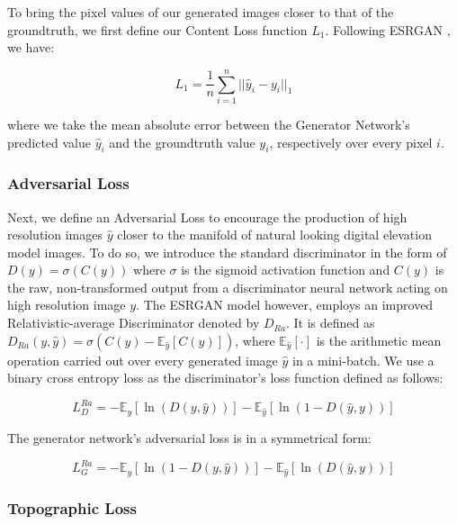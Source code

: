 \documentclass[tc, manuscript]{copernicus}
\begin{document}
To bring the pixel values of our generated images closer to that of the groundtruth, we first define our Content Loss function $L_1$.
Following ESRGAN \citep{WangESRGANEnhancedSuperResolution2018}, we have:

\begin{equation}\label{eq:4}
  L_1 = \dfrac{1}{n} \sum\limits_{i=1}^n ||\hat{y}_i - y_i||_{1}
\end{equation}

where we take the mean absolute error between the Generator Network's predicted value $\hat{y}_i$ and the groundtruth value $y_i$, respectively over every pixel $i$.

\subsubsection{Adversarial Loss}

Next, we define an Adversarial Loss to encourage the production of high resolution images $\hat{y}$ closer to the manifold of natural looking digital elevation model images.
To do so, we introduce the standard discriminator in the form of $D(y) = \sigma(C(y))$ where $\sigma$ is the sigmoid activation function and $C(y)$ is the raw, non-transformed output from a discriminator neural network acting on high resolution image $y$.
The ESRGAN model \citep{WangESRGANEnhancedSuperResolution2018} however, employs an improved Relativistic-average Discriminator \citep{Jolicoeur-Martineaurelativisticdiscriminatorkey2018} denoted by $D_{Ra}$.
It is defined as $D_{Ra}(y,\hat{y}) = \sigma(C(y) - \mathbb{E}_{\hat{y}}[C(\hat{y})])$, where $\mathbb{E}_{\hat{y}}[\cdot]$ is the arithmetic mean operation carried out over every generated image $\hat{y}$ in a mini-batch.
We use a binary cross entropy loss as the discriminator's loss function defined as follows:

\begin{equation}\label{eq:5}
  L_D^{Ra} = - \mathbb{E}_y[\ln(D(y,\hat{y}))] - \mathbb{E}_{\hat{y}}[\ln(1 - D(\hat{y},y))]
\end{equation}

The generator network's adversarial loss is in a symmetrical form:

\begin{equation}\label{eq:6}
  L_G^{Ra} = - \mathbb{E}_y[\ln(1 - D(y,\hat{y}))] - \mathbb{E}_{\hat{y}}[\ln(D(\hat{y},y))]
\end{equation}

\subsubsection{Topographic Loss}
\end{document}
